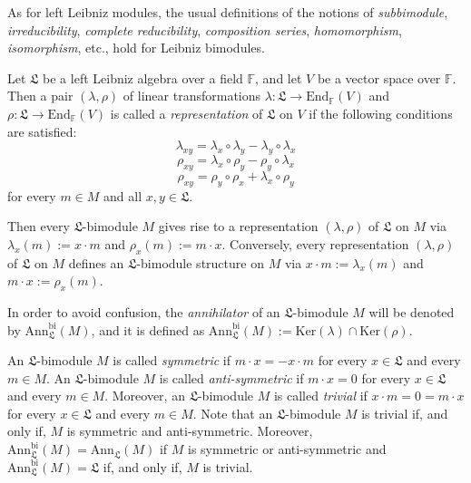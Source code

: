 \documentclass{amsart}
\numberwithin{equation}{section}
\newcommand{\bi}{\mathrm{bi}}
\newcommand{\Ker}{\mathrm{Ker}}
\newcommand{\ann}{\mathrm{Ann}}
\newcommand{\End}{\mathrm{End}}
\newcommand{\F}{\mathbb{F}}
\newcommand{\lf}{\mathfrak{L}}
\begin{document}
As for left Leibniz modules, the usual definitions of the notions of {\em subbimodule\/}, {\em
irreducibility\/}, {\em complete reducibility\/}, {\em composition series\/}, {\em homomorphism\/},
{\em isomorphism\/}, etc., hold for Leibniz bimodules.

Let $\lf$ be a left Leibniz algebra over a field $\F$, and let $V$ be a vector space over $\F$.
Then a pair $(\lambda,\rho)$ of linear transformations $\lambda:\lf\to\End_\F(V)$ and $\rho:
\lf\to\End_\F(V)$ is called a {\em representation\/} of $\lf$ on $V$ if the following conditions
are satisfied:
\begin{equation}\label{LLMrep}
\lambda_{xy}=\lambda_x\circ\lambda_y-\lambda_y\circ\lambda_x
\end{equation}
\begin{equation}\label{LMLrep}
\rho_{xy}=\lambda_x\circ\rho_y-\rho_y\circ\lambda_x
\end{equation}
\begin{equation}\label{MLLrep}
\rho_{xy}=\rho_y\circ\rho_x+\lambda_x\circ\rho_y
\end{equation}
for every $m\in M$ and all $x,y\in\lf$.

Then every $\lf$-bimodule $M$ gives rise to a representation $(\lambda,\rho)$ of $\lf$ on $M$
via $\lambda_x(m):=x\cdot m$ and $\rho_x(m):=m\cdot x$. Conversely, every representation
$(\lambda,\rho)$ of $\lf$ on $M$ defines an $\lf$-bimodule structure on $M$ via $x\cdot m:=
\lambda_x(m)$ and $m\cdot x:=\rho_x(m)$.

In order to avoid confusion, the {\em annihilator\/} of an $\lf$-bimodule $M$ will be denoted by
$\ann_\lf^\bi(M)$, and it is defined as $\ann_\lf^\bi(M):=\Ker(\lambda)\cap\Ker(\rho)$.

An $\lf$-bimodule $M$ is called {\em symmetric\/} if $m\cdot x=-x\cdot m$ for every $x\in\lf$
and every $m\in M$. An $\lf$-bimodule $M$ is called {\em anti-symmetric\/} if $m\cdot x=0$
for every $x\in\lf$ and every $m\in M$. Moreover, an $\lf$-bimodule $M$ is called {\em trivial\/}
if $x\cdot m=0=m\cdot x$ for every $x\in\lf$ and every $m\in M$. Note that an $\lf$-bimodule
$M$ is trivial if, and only if, $M$ is symmetric and anti-symmetric. Moreover, $\ann_\lf^\bi(M)=
\ann_\lf(M)$ if $M$ is symmetric or anti-symmetric and $\ann_\lf^\bi(M)=\lf$ if, and only if, $M$
is trivial.
\vspace{.2cm}
\end{document}

